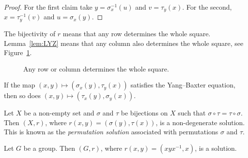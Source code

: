 \begin{proof}
    For the first claim take $y=\sigma_x^{-1}(u)$ and $v=\tau_y(x)$. 
    For the second, $x=\tau_y^{-1}(v)$ and $u=\sigma_x(y)$. 
\end{proof}

The bijectivity of $r$ means that any row determines the whole square. Lemma~\ref{lem:LYZ}
means that any column also determines the whole square, see Figure~\ref{fig:braid}.

\begin{figure}
\centering
{}
\caption{Any row or column determines the whole square.}
\label{fig:braid}
\end{figure}

\begin{example}
If the map $(x,y)\mapsto(\sigma_x(y),\tau_y(x))$ satisfies the Yang--Baxter equation, then 
so does $(x,y)\mapsto (\tau_x(y),\sigma_y(x))$. 
\end{example}

\begin{example}
\label{exa:Lyubashenko}
Let $X$ be a non-empty set and $\sigma$ and $\tau$ be 
bijections on $X$ such that $\sigma\circ\tau=\tau\circ\sigma$. Then 
$(X,r)$, where $r(x,y)=(\sigma(y),\tau(x))$, is a non-degenerate solution. 
This is known as the \emph{permutation solution} associated
with permutations $\sigma$ and $\tau$. 
\end{example}
%

\begin{example}
\label{exa:Venkov}
Let $G$ be a group. Then $(G,r)$, where $r(x,y)=(xyx^{-1},x)$, is a solution. 
\end{example}

